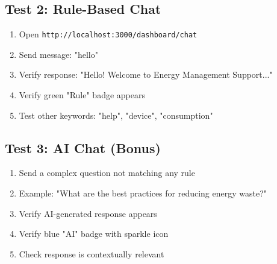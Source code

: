 \documentclass[12pt,a4paper]{article}
\begin{document}
\subsection{Test 2: Rule-Based Chat}
\begin{enumerate}
    \item Open \texttt{http://localhost:3000/dashboard/chat}
    \item Send message: "hello"
    \item Verify response: "Hello! Welcome to Energy Management Support..."
    \item Verify green "Rule" badge appears
    \item Test other keywords: "help", "device", "consumption"
\end{enumerate}

\subsection{Test 3: AI Chat (Bonus)}
\begin{enumerate}
    \item Send a complex question not matching any rule
    \item Example: "What are the best practices for reducing energy waste?"
    \item Verify AI-generated response appears
    \item Verify blue "AI" badge with sparkle icon
    \item Check response is contextually relevant
\end{enumerate}
\end{document}
